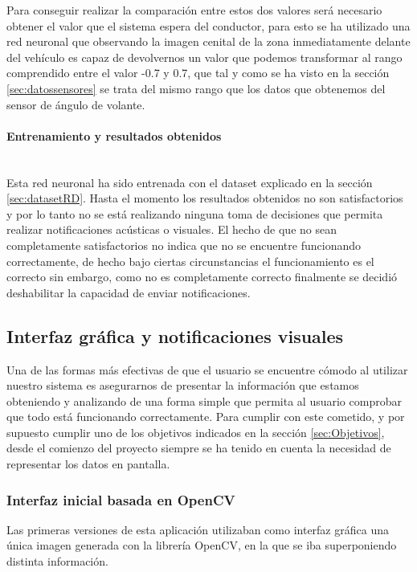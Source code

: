 Para conseguir realizar la comparación entre estos dos valores será necesario obtener el valor que el sistema espera del conductor, para esto se ha utilizado una red neuronal que observando la imagen cenital de la zona inmediatamente delante del vehículo es capaz de devolvernos un valor que podemos transformar al rango comprendido entre el valor -0.7 y 0.7, que tal y como se ha visto en la sección \ref{sec:datossensores} se trata del mismo rango que los datos que obtenemos del sensor de ángulo de volante.

\paragraph{Entrenamiento y resultados obtenidos}\mbox{}\\
Esta red neuronal ha sido entrenada con el dataset explicado en la sección \ref{sec:datasetRD}.
Hasta el momento los resultados obtenidos no son satisfactorios y por lo tanto no se está realizando ninguna toma de decisiones que permita realizar notificaciones acústicas o visuales. El hecho de que no sean completamente satisfactorios no indica que no se encuentre funcionando correctamente, de hecho bajo ciertas circunstancias el funcionamiento es el correcto sin embargo, como no es completamente correcto finalmente se decidió deshabilitar la capacidad de enviar notificaciones.







\clearpage
\subsection{Interfaz gráfica y notificaciones visuales}

Una de las formas más efectivas de que el usuario se encuentre cómodo al utilizar nuestro sistema es asegurarnos de presentar la información que estamos obteniendo y analizando de una forma simple que permita al usuario comprobar que todo está funcionando correctamente.
Para cumplir con este cometido, y por supuesto cumplir uno de los objetivos indicados en la sección \ref{sec:Objetivos}, desde el comienzo del proyecto siempre se ha tenido en cuenta la necesidad de representar los datos en pantalla.

\subsubsection{Interfaz inicial basada en OpenCV}
Las primeras versiones de esta aplicación utilizaban como interfaz gráfica una única imagen generada con la librería OpenCV, en la que se iba superponiendo distinta información.

